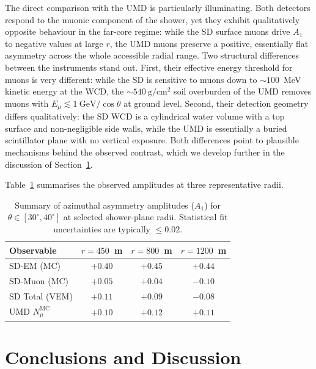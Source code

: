 \documentclass[11pt,a4paper]{article}
\begin{document}
The direct comparison with the UMD is particularly illuminating. Both detectors respond to the muonic component of the shower, yet they exhibit qualitatively opposite behaviour in the far-core regime: while the SD surface muons drive $A_1$ to negative values at large $r$, the UMD muons preserve a positive, essentially flat asymmetry across the whole accessible radial range. Two structural differences between the instruments stand out. First, their effective energy threshold for muons is very different: while the SD is sensitive to muons down to $\sim 100$~MeV kinetic energy at the WCD, the $\sim 540~\mathrm{g/cm^{2}}$ soil overburden of the UMD removes muons with $E_\mu \lesssim 1 ~\mathrm{GeV}/\cos\theta$ at ground level. Second, their detection geometry differs qualitatively: the SD WCD is a cylindrical water volume with a top surface and non-negligible side walls, while the UMD is essentially a buried scintillator plane with no vertical exposure. Both differences point to plausible mechanisms behind the observed contrast, which we develop further in the discussion of Section~\ref{sec:conclusions}.

Table~\ref{tab:a1_summary} summarises the observed amplitudes at three representative radii.

\begin{table}[h]
\centering
\caption{Summary of azimuthal asymmetry amplitudes ($A_1$) for $\theta \in [30^\circ, 40^\circ]$ at selected shower-plane radii. Statistical fit uncertainties are typically $\le 0.02$.}
\label{tab:a1_summary}
\begin{tabular}{l c c c}
\toprule
\textbf{Observable} & \textbf{$r = 450$~m} & \textbf{$r = 800$~m} & \textbf{$r = 1200$~m} \\
\midrule
SD-EM (MC) & $+0.40$ & $+0.45$ & $+0.44$ \\
SD-Muon (MC) & $+0.05$ & $+0.04$ & $-0.10$ \\
SD Total (VEM) & $+0.11$ & $+0.09$ & $-0.08$ \\
UMD $N_\mu^{\mathrm{MC}}$ & $+0.10$ & $+0.12$ & $+0.11$ \\
\bottomrule
\end{tabular}
\end{table}

\section{Conclusions and Discussion}
\label{sec:conclusions}
\end{document}
